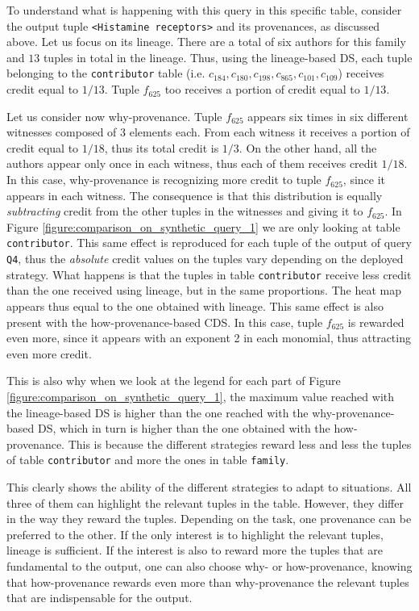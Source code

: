 To understand what is happening with this query in this specific table, consider the output tuple \texttt{<Histamine receptors>} and its provenances, as discussed above.
Let us focus on its lineage. There are a total of six authors for this family and $13$ tuples in total in the lineage. 
Thus, using the lineage-based DS, each tuple belonging to the \texttt{contributor} table (i.e. $c_{184}, c_{180}, c_{198}, c_{865}, c_{101}, c_{109}$) receives credit equal to $1/13$.
Tuple $f_{625}$ too receives a portion of credit equal to $1/13$.

Let us consider now why-provenance. Tuple $f_{625}$ appears six times in six different witnesses composed of $3$ elements each. From each witness it receives a portion of credit equal to $1/18$, thus its total credit is $1/3$.
On the other hand, all the authors appear only once in each witness, thus each of them receives credit $1/18$. 
In this case, why-provenance is recognizing more credit to tuple $f_{625}$, since it appears in each witness. The consequence is that this distribution is equally \emph{subtracting} credit from the other tuples in the witnesses and giving it to $f_{625}$. 
In Figure \ref{figure:comparison_on_synthetic_query_1} we are only looking at table \texttt{contributor}. 
This same effect is reproduced for each tuple of the output of query \texttt{Q4}, thus the \emph{absolute} credit values on the tuples vary depending on the deployed strategy. 
What happens is that the tuples in table \texttt{contributor} receive less credit than the one received using lineage, but in the same proportions. The heat map appears thus equal to the one obtained with lineage.
This same effect is also present with the how-provenance-based CDS. In this case, tuple $f_{625}$ is rewarded even more, since it appears with an exponent 2 in each monomial, thus attracting even more credit. 

This is also why when we look at the legend for each part of Figure \ref{figure:comparison_on_synthetic_query_1}, the maximum value reached with the lineage-based DS is higher than the one reached with the why-provenance-based DS, which in turn is higher than the one obtained with the how-provenance. This is because the different strategies reward less and less the tuples of table \texttt{contributor} and more the ones in table \texttt{family}. 

This clearly shows the ability of the different strategies to adapt to situations. All three of them can highlight the relevant tuples in the table. However, they differ in the way they reward the tuples. 
Depending on the task, one provenance can be preferred to the other. 
If the only interest is to highlight the relevant tuples, lineage is sufficient. 
If the interest is also to reward more the tuples that are fundamental to the output, one can also choose why- or how-provenance, knowing that how-provenance rewards even more than why-provenance the relevant tuples that are indispensable for the output.  

